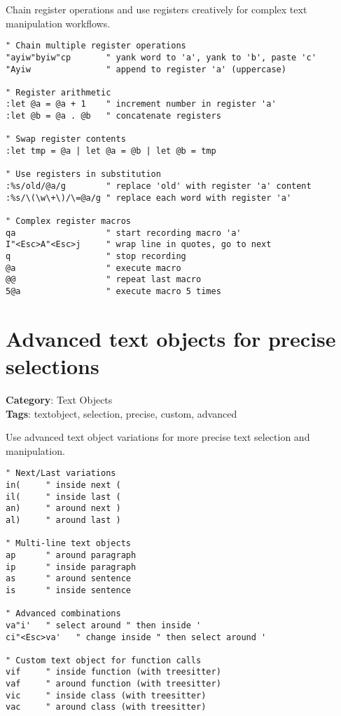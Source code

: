 Chain register operations and use registers creatively for complex text manipulation workflows.

\begin{Exa*}{}
\begin{Verbatim}[fontsize=\footnotesize, breaklines, breakanywhere]
" Chain multiple register operations
"ayiw"byiw"cp       " yank word to 'a', yank to 'b', paste 'c'
"Ayiw               " append to register 'a' (uppercase)

" Register arithmetic
:let @a = @a + 1    " increment number in register 'a'
:let @b = @a . @b   " concatenate registers

" Swap register contents
:let tmp = @a | let @a = @b | let @b = tmp

" Use registers in substitution
:%s/old/@a/g        " replace 'old' with register 'a' content
:%s/\(\w\+\)/\=@a/g " replace each word with register 'a'

" Complex register macros
qa                  " start recording macro 'a'
I"<Esc>A"<Esc>j     " wrap line in quotes, go to next
q                   " stop recording
@a                  " execute macro
@@                  " repeat last macro
5@a                 " execute macro 5 times
\end{Verbatim}
\end{Exa*}

\section{Advanced text objects for precise selections}

\textbf{Category}: Text Objects\\ \textbf{Tags}: textobject, selection, precise, custom, advanced
\vspace{0.5cm}

Use advanced text object variations for more precise text selection and manipulation.

\begin{Exa*}{}
\begin{Verbatim}[fontsize=\footnotesize, breaklines, breakanywhere]
" Next/Last variations
in(     " inside next (
il(     " inside last (
an)     " around next )
al)     " around last )

" Multi-line text objects
ap      " around paragraph
ip      " inside paragraph
as      " around sentence
is      " inside sentence

" Advanced combinations
va"i'   " select around " then inside '
ci"<Esc>va'   " change inside " then select around '

" Custom text object for function calls
vif     " inside function (with treesitter)
vaf     " around function (with treesitter)
vic     " inside class (with treesitter)
vac     " around class (with treesitter)
\end{Verbatim}
\end{Exa*}

